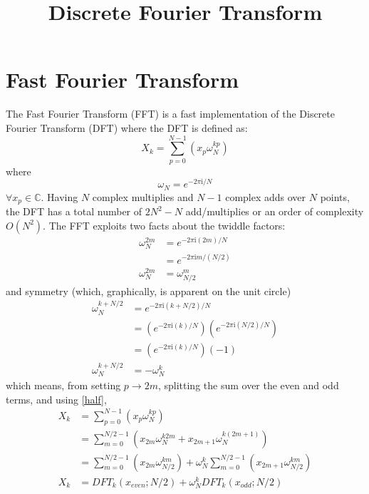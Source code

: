 \documentclass{article}
\begin{document}
%
\title{Discrete Fourier Transform}
%
\maketitle
%
\section {Fast Fourier Transform}
%
The Fast Fourier Transform (FFT) is a fast implementation of the Discrete Fourier Transform (DFT) where the DFT is defined as:
%
\begin {equation} \label {eq:dft}
X_k = \sum_{p = 0}^{N-1} (x_p \omega_N^{k p})
\end {equation}
%
where
%
\begin {equation} \label {eq:twiddle}
\omega_N = e^{-2 \pi \mathrm {i} / N}
\end {equation}
%
$\forall x_p \in \mathbb {C}$. Having $N$ complex multiplies and $N-1$ complex adds over $N$ points, the DFT has a total number of $2 N^2 - N$ add/multiplies or an order of complexity $O(N^2)$. The FFT exploits two facts about the twiddle factors:
%
\begin {equation} \label {half}
\begin {aligned}
\omega_N^{2m} &= e^{-2 \pi \mathrm {i} (2m) / N}    \\
              &= e^{-2 \pi \mathrm {i} m / (N / 2)} \\
\omega_N^{2m} &= \omega_{N/2}^m
\end {aligned}
\end {equation}
%
and symmetry (which, graphically, is apparent on the unit circle)
%
\begin {equation} \label {symmetry}
\begin {aligned}
\omega_N^{k + N/2} &= e^{-2 \pi \mathrm {i} (k + N/2) / N} \\
             &= \left (e^{-2 \pi \mathrm {i} (k) / N} \right) \left (e^{-2 \pi \mathrm {i} (N/2) / N} \right) \\
             &= \left (e^{-2 \pi \mathrm {i} (k) / N} \right) \left (-1 \right) \\
\omega_N^{k + N/2} &= -\omega_{N}^{k}
\end {aligned}
\end {equation}
%
which means, from setting $p \rightarrow 2m$, splitting the sum over the even and odd terms, and using \eqref{half},
%
\begin {equation} \label {eq:xk}
\begin {aligned}
X_k &= \sum_{p = 0}^{N-1} (x_p \omega_N^{k p}) \\
    &= \sum_{m = 0}^{N/2-1} (x_{2m} \omega_N^{k 2 m} + x_{2m+1} \omega_N^{k (2 m + 1)}) \\
    &= \sum_{m = 0}^{N/2-1} (x_{2m} \omega_{N/2}^{k m}) + \omega_N^{k} \sum_{m = 0}^{N/2-1} (x_{2m+1} \omega_{N/2}^{km}) \\
X_k &= DFT_k(x_{even}; N/2) + \omega_N^{k} DFT_k(x_{odd}; N/2)
\end {aligned}
\end {equation}
\end{document}
